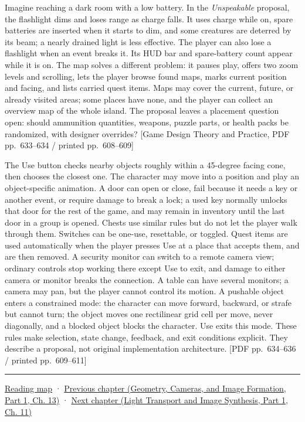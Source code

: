 Imagine reaching a dark room with a low battery. In the \emph{Unspeakable} proposal, the flashlight dims and loses range as charge falls. It uses charge while on, spare batteries are inserted when it starts to dim, and some creatures are deterred by its beam; a nearly drained light is less effective. The player can also lose a flashlight when an event breaks it. Its HUD bar and spare-battery count appear while it is on. The map solves a different problem: it pauses play, offers two zoom levels and scrolling, lets the player browse found maps, marks current position and facing, and lists carried quest items. Maps may cover the current, future, or already visited areas; some places have none, and the player can collect an overview map of the whole island. The proposal leaves a placement question open: should ammunition quantities, weapons, puzzle parts, or health packs be randomized, with designer overrides? {[}Game Design Theory and Practice, PDF pp.~633--634 / printed pp.~608--609{]}

The Use button checks nearby objects roughly within a 45-degree facing cone, then chooses the closest one. The character may move into a position and play an object-specific animation. A door can open or close, fail because it needs a key or another event, or require damage to break a lock; a used key normally unlocks that door for the rest of the game, and may remain in inventory until the last door in a group is opened. Chests use similar rules but do not let the player walk through them. Switches can be one-use, resettable, or toggled. Quest items are used automatically when the player presses Use at a place that accepts them, and are then removed. A security monitor can switch to a remote camera view; ordinary controls stop working there except Use to exit, and damage to either camera or monitor breaks the connection. A table can have several monitors; a camera may pan, but the player cannot control its motion. A pushable object enters a constrained mode: the character can move forward, backward, or strafe but cannot turn; the object moves one rectilinear grid cell per move, never diagonally, and a blocked object blocks the character. Use exits this mode. These rules make selection, state change, feedback, and exit conditions explicit. They describe a proposal, not original implementation architecture. {[}PDF pp.~634--636 / printed pp.~609--611{]}

\begin{center}\rule{0.5\linewidth}{0.5pt}\end{center}

\hyperref[volume-reading-map]{Reading map} · \href{../03-Geometry-Cameras-and-Image-Formation-P01/main.pdf\#06-engine-ii-ch030-depth-projection-and-shadow-map-precision}{Previous chapter (Geometry, Cameras, and Image Formation, Part 1, Ch. 13)} · \href{../04-Light-Transport-and-Image-Synthesis-P01/main.pdf\#06-engine-ii-ch032-terrain-materials-and-image-composition}{Next chapter (Light Transport and Image Synthesis, Part 1, Ch. 11)}
